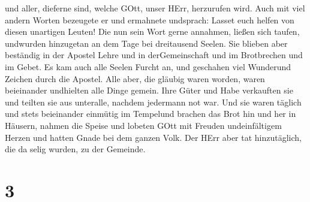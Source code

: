 und aller, dieferne sind, welche GOtt, unser HErr, herzurufen wird.
 Auch mit viel andern Worten bezeugete er und ermahnete
undsprach: Lasset euch helfen von diesen unartigen Leuten! 
Die nun sein Wort gerne annahmen, ließen sich taufen, undwurden
hinzugetan an dem Tage bei dreitausend Seelen.  Sie blieben
aber beständig in der Apostel Lehre und in derGemeinschaft und im
Brotbrechen und im Gebet.  Es kam auch alle Seelen Furcht
an, und geschahen viel Wunderund Zeichen durch die Apostel.
 Alle aber, die gläubig waren worden, waren beieinander
undhielten alle Dinge gemein.  Ihre Güter und Habe
verkauften sie und teilten sie aus unteralle, nachdem jedermann not war.
 Und sie waren täglich und stets beieinander einmütig im
Tempelund brachen das Brot hin und her in Häusern,  nahmen
die Speise und lobeten GOtt mit Freuden undeinfältigem Herzen und hatten
Gnade bei dem ganzen Volk. Der HErr aber tat hinzutäglich, die da selig
wurden, zu der Gemeinde.

\hypertarget{section-2}{%
\section{3}\label{section-2}}

